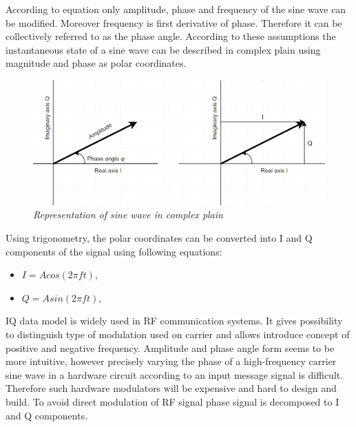 \documentclass[en,printmode]{mgr}
\begin{document}
		According to equation \label{eq:sinewave} only amplitude, phase and frequency of the sine wave can be
		modified. Moreover frequency is first derivative of phase. Therefore it can be collectively referred to 
		as the phase angle. According to these assumptions the instantaneous state of a sine wave can be described
		in complex plain using magnitude and phase as polar coordinates.
		
		\begin{figure}[!htb]
    		\centering
   			\includegraphics[width=\textwidth]{plots/polarplots.png}
    		\caption{\textit{Representation of sine wave in complex plain}}
    		\label{fig:polarplot}
		\end{figure}
		
		\newpage
		Using trigonometry, the polar coordinates can be converted into I and Q components of the signal using following
		equations:
		\begin{itemize}
			\item $I = A cos\left(2\pi f t\right)$, \label{eq:IQ}
			\item $Q = A sin\left(2\pi f t\right)$,
		\end{itemize}
		\vspace{0.5cm}
		
		IQ data model is widely used in RF communication systems. It gives possibility to distinguish type of 
		modulation used 
		on carrier and allows introduce concept of positive and negative frequency. Amplitude and phase angle form
		seems to be more intuitive, however precisely varying the phase of a high-frequency carrier sine wave in a
		hardware circuit according to an input message signal is difficult. Therefore such hardware modulators will
		be expensive and hard to design and build. To avoid direct modulation of RF signal phase signal is decomposed
		to I and Q components.
		\\
		
\end{document}

